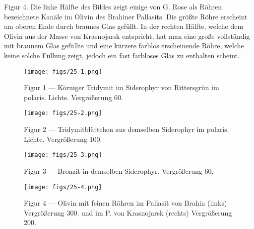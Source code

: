 \documentclass[a4paper, 11pt, oneside, polutonikogreek, german]{article}
\begin{document}
Figur 4. Die linke Hälfte des Bildes zeigt einige von G. Rose als Röhren bezeichnete Kanäle im Olivin des Brahiner Pallasits. Die größte Röhre erscheint am oberen Ende durch braunes Glas gefüllt. In der rechten Hälfte, welche dem Olivin aus der Masse von Krasnojarsk entspricht, hat man eine große vollständig mit braunem Glas gefüllte und eine kürzere farblos erscheinende Röhre, welche keine solche Füllung zeigt, jedoch ein fast farbloses Glas zu enthalten scheint.
\clearpage

\vspace*{\fill}
\begin{figure}[H]
\centering
\texttt{[image: figs/25-1.png]}
\caption{\small Figur 1 --- Körniger Tridymit im Siderophyr von Rittersgrün im polaris. Lichte. Vergrößerung 60.}
\end{figure}
\vspace*{\fill}
\clearpage

\vspace*{\fill}
\begin{figure}[H]
\centering
\texttt{[image: figs/25-2.png]}
\caption{\small Figur 2 --- Tridymitblättchen aus demselben Siderophyr im polaris. Lichte. Vergrößerung 100.}
\end{figure}
\vspace*{\fill}
\clearpage

\vspace*{\fill}
\begin{figure}[H]
\centering
\texttt{[image: figs/25-3.png]}
\caption{\small Figur 3 --- Bronzit in demselben Siderophyr. Vergrößerung 60.}
\end{figure}
\vspace*{\fill}
\clearpage

\vspace*{\fill}
\begin{figure}[H]
\centering
\texttt{[image: figs/25-4.png]}
\caption{\small Figur 4 --- Olivin mit feinen Röhren im Pallasit von Brahin (links) Vergrößerung 300. und im P. von Krasnojarsk (rechts) Vergrößerung 200.}
\end{figure}
\vspace*{\fill}
\clearpage
\end{document}
